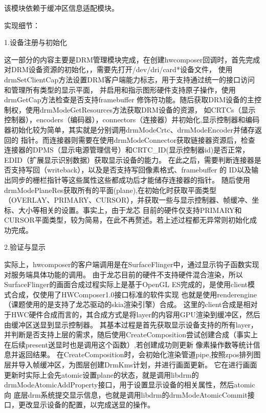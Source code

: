 该模块依赖于缓冲区信息适配模块。

实现细节：

1.设备注册与初始化

这一部分的内容主要是DRM管理模块完成，在创建hwcomposer回调时，首先完成对DRM设备资源的初始化，，需要先打开/dev/dri/card*设备文件，
使用drmSetClientCap方法设置DRM客户端能力标志，用于支持通过统一的接口访问和管理所有类型的显示平面，
并启用和指示图形硬件支持原子操作，使用drmGetCap方法检查是否支持framebuffer 修饰符功能。随后获取DRM设备的主控制权，使用drmModeGetResources方法获取DRM设备的资源，
如CRTCs（显示控制器），encoders（编码器），connectors（连接器）并初始化,显示控制器和编码器初始化较为简单，其实就是分别调用drmModeCrtc、drmModeEncoder并储存返回的
指针。而连接器则需要在使用drmModeConnector获取链接器资源后，检查连接器的DPMS（显示电源管理信号）和CRTC\_ID(显示控制器id)是否正常，EDID（扩展显示识别数据）获取显示设备的能力。
在此之后，需要判断连接器是否支持写回（writeback），以及是否支持写回像素格式、framebuffer 的 ID以及输出同步的栅栏指针等这些属性这些都成功后才能储存连接器的指针。
随后使用drmModePlaneRes获取所有的平面(plane),在初始化时获取平面类型（OVERLAY、PRIMARY、CURSOR），并获取一些与显示控制器、帧缓冲、坐标、大小等相关的设置。事实上，由于龙芯
目前的硬件仅支持PRIMARY和CURSOR平面类型，较为简易，在此不再赘述。若上述过程都无异常则初始化成功完成。

2.验证与显示

实际上，hwcomposer的客户端调用是在SurfaceFlinger中，通过显示钩子函数实现对服务端具体功能的调用。
由于龙芯目前的硬件不支持硬件混合渲染，所以SurfaceFlinger的画面合成过程实际上是基于OpenGL ES完成的，是使用client模式合成，仅使用了HWComposer1.0接口标准的软件实现
也就是使用renderengine（课题使用的是支持了龙芯驱动的skia渲染引擎）合成。
这里的client合成是相对于HWC硬件合成而言的，其合成方式是将layer的内容用GPU渲染到缓冲区，然后由缓冲区送显到显示控制器。
其基本过程是首先获取显示设备支持的所有layer，并判断是否支持上层的需求，随后使用CreateComposition尝试创建合成（事实上在后续present送显时也是调用这个函数）,若创建成功则更新
像素操作数等统计信息并返回结果。
在CreateComposition时，会初始化渲染管道pipe,按照zpos排列图层并导入帧缓冲区，为图层创建DrmKms计划，并进行画面更新。
它在进行画面更新时实际上会先atomic设置plane的状态，就是调用libdrm的drmModeAtomicAddProperty接口，用于设置显示设备的相关属性，然后atomic向
底层drm系统提交显示信息，也就是调用libdrm的drmModeAtomicCommit接口，更改显示设备的配置，以完成送显的操作。


